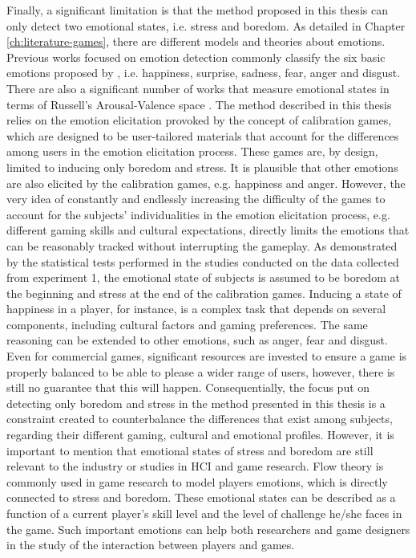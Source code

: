 Finally, a significant limitation is that the method proposed in this thesis can only detect two emotional states, i.e. stress and boredom. As detailed in Chapter \ref{ch:literature-games}, there are different models and theories about emotions. Previous works focused on emotion detection commonly classify the six basic emotions proposed by \textcite{ekman1971constants}, i.e. happiness, surprise, sadness, fear, anger and disgust. There are also a significant number of works that measure emotional states in terms of Russell's Arousal-Valence space \parencite{russell1978evidence}. The method described in this thesis relies on the emotion elicitation provoked by the concept of calibration games, which are designed to be user-tailored materials that account for the differences among users in the emotion elicitation process. These games are, by design, limited to inducing only boredom and stress. It is plausible that other emotions are also elicited by the calibration games, e.g. happiness and anger. However, the very idea of constantly and endlessly increasing the difficulty of the games to account for the subjects' individualities in the emotion elicitation process, e.g. different gaming skills and cultural expectations, directly limits the emotions that can be reasonably tracked without interrupting the gameplay. As demonstrated by the statistical tests performed in the studies conducted on the data collected from experiment 1, the emotional state of subjects is assumed to be boredom at the beginning and stress at the end of the calibration games. Inducing a state of happiness in a player, for instance, is a complex task that depends on several components, including cultural factors and gaming preferences. The same reasoning can be extended to other emotions, such as anger, fear and disgust. Even for commercial games, significant resources are invested to ensure a game is properly balanced to be able to please a wider range of users, however, there is still no guarantee that this will happen. Consequentially, the focus put on detecting only boredom and stress in the method presented in this thesis is a constraint created to counterbalance the differences that exist among subjects, regarding their different gaming, cultural and emotional profiles. However, it is important to mention that emotional states of stress and boredom are still relevant to the industry or studies in HCI and game research. Flow theory is commonly used in game research to model players emotions, which is directly connected to stress and boredom. These emotional states can be described as a function of a current player's skill level and the level of challenge he/she faces in the game. Such important emotions can help both researchers and game designers in the study of the interaction between players and games.

